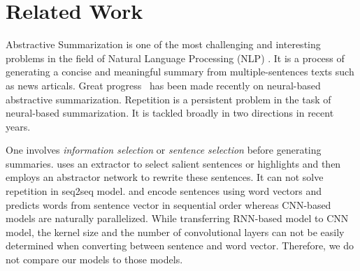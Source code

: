 \section{Related Work}
\label{sec:related}

Abstractive Summarization
is one of the most challenging and interesting problems 
in the field of Natural Language Processing (NLP)
\citep{CareniniC08,PallottaDB09,SankarasubramaniamRG14,BingLLLGP15,RushCW15,LiHZ16,YaoWX17,MohamedO19,LierdeC19,NguyenCNN19}.
It is a process of generating a concise and meaningful summary 
from multiple-sentences texts
such as news articals.
Great progress~
\citep{RushCW15,ChopraAR16,NallapatiZSGX16,SeeLM17,PaulusXS17,HardyV18,KourisAS19,LiuL19,ZhangWZ19,WangQW19}
has been made recently on
neural-based abstractive summarization.
Repetition is a persistent problem in the task of 
neural-based summarization. 
It is tackled broadly in two directions in recent years. 

One involves {\em information selection} or 
{\em sentence selection} before generating summaries.
\cite{P18-1063} uses an extractor  
to select salient sentences or highlights and then employs 
an abstractor network to rewrite these sentences.
It can not solve repetition in seq2seq model.
\cite{TanWX17} and \cite{D18-1205,D18-1441} encode
sentences using word vectors
and predicts words from sentence vector in sequential order 
whereas CNN-based models are naturally parallelized. 
While transferring RNN-based model to CNN model, 
the kernel size and the number of 
convolutional layers can not be easily determined when
converting between sentence and word vector. 
Therefore, we do not compare our models to those models. 

